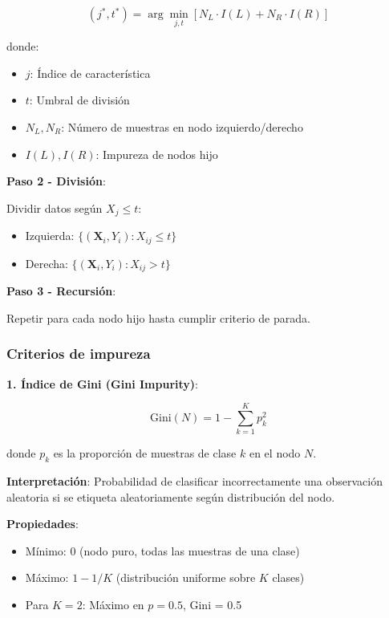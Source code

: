 \documentclass[
  doc,
  floatsintext,
  longtable,
  a4paper,
  nolmodern,
  notxfonts,
  notimes,
  12pt,
  colorlinks=true,linkcolor=blue,citecolor=blue,urlcolor=blue]{apa7}
\providecommand{\tightlist}{%
  \setlength{\itemsep}{0pt}\setlength{\parskip}{0pt}}
\begin{document}
\[
(j^*, t^*) = \arg\min_{j, t} \left[ N_L \cdot I(L) + N_R \cdot I(R) \right]
\]

donde:

\begin{itemize}
\tightlist
\item
  \(j\): Índice de característica
\item
  \(t\): Umbral de división
\item
  \(N_L, N_R\): Número de muestras en nodo izquierdo/derecho
\item
  \(I(L), I(R)\): Impureza de nodos hijo
\end{itemize}

\textbf{Paso 2 - División}:

Dividir datos según \(X_j \leq t\):

\begin{itemize}
\tightlist
\item
  Izquierda: \(\{(\mathbf{X}_i, Y_i) : X_{ij} \leq t\}\)
\item
  Derecha: \(\{(\mathbf{X}_i, Y_i) : X_{ij} > t\}\)
\end{itemize}

\textbf{Paso 3 - Recursión}:

Repetir para cada nodo hijo hasta cumplir criterio de parada.

\subsubsection{Criterios de impureza}\label{criterios-de-impureza}

\textbf{1. Índice de Gini (Gini Impurity)}:

\[
\text{Gini}(N) = 1 - \sum_{k=1}^{K} p_k^2
\]

donde \(p_k\) es la proporción de muestras de clase \(k\) en el nodo
\(N\).

\textbf{Interpretación}: Probabilidad de clasificar incorrectamente una
observación aleatoria si se etiqueta aleatoriamente según distribución
del nodo.

\textbf{Propiedades}:

\begin{itemize}
\tightlist
\item
  Mínimo: 0 (nodo puro, todas las muestras de una clase)
\item
  Máximo: \(1 - 1/K\) (distribución uniforme sobre \(K\) clases)
\item
  Para \(K=2\): Máximo en \(p=0.5\), Gini = 0.5
\end{itemize}
\end{document}
